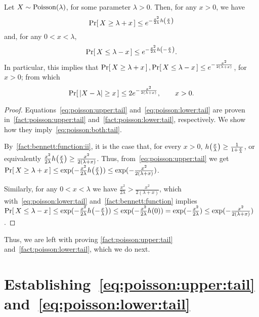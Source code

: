 \documentclass[10pt]{article}
\newcommand{\bennettfunc}{h}
\newcommand{\bennett}[1]{\bennettfunc\mleft(#1\mright)}
\begin{document}
\begin{theorem}\label{theo:main:poisson:bounds}
Let $X\sim\operatorname{Poisson}\!\left( \lambda \right) $, for some parameter $\lambda > 0$. Then, for any $x>0$, we have
\begin{equation}\label{eq:poisson:upper:tail}
    \probaOf{ X \geq \lambda + x} \leq e^{-\frac{x^2}{2\lambda}\bennett{\frac{x}{\lambda}}}
\end{equation}
and, for any $0<x< \lambda$,
\begin{equation}\label{eq:poisson:lower:tail}
  \probaOf{ X \leq \lambda - x} \leq e^{-\frac{x^2}{2\lambda}\bennett{-\frac{x}{\lambda}}}.
\end{equation}
In particular, this implies that $\Pr\!\left[\,  X \geq \lambda + x\, \right],\Pr\!\left[\,  X \leq \lambda - x\, \right] \leq e^{-\frac{x^2}{2(\lambda+x)}}$, for $x>0$; from which
\begin{equation}\label{eq:poisson:both:tail}
  \Pr\!\left[\,  \left\lvert X -\lambda \right\rvert \geq x\, \right] \leq 2e^{-\frac{x^2}{2(\lambda+x)}}, \qquad x>0.
\end{equation}
\end{theorem}
\begin{proof}
Equations~\eqref{eq:poisson:upper:tail} and~\eqref{eq:poisson:lower:tail} are proven in~\autoref{fact:poisson:upper:tail} and~\autoref{fact:poisson:lower:tail}, respectively. We show how they imply~\eqref{eq:poisson:both:tail}.

\noindent By~\autoref{fact:bennett:function:ii}, it is the case that,  for every $x>0$, $\bennett{\frac{x}{\lambda}} \geq \frac{1}{1+\frac{x}{\lambda}}$, or equivalently
$
\frac{x^2}{2\lambda} \bennett{\frac{x}{\lambda}} \geq \frac{x^2}{2(\lambda+x)}
$. Thus, from~\eqref{eq:poisson:upper:tail} we get $\probaOf{ X \geq \lambda + x} \leq \exp(-\frac{x^2}{2\lambda}\bennett{\frac{x}{\lambda}}) \leq \exp(-\frac{x^2}{2(\lambda+x)})$.

\noindent Similarly, for any $0<x<\lambda$ we have $\frac{x^2}{2\lambda} > \frac{x^2}{2(\lambda+x)}$, which with~\eqref{eq:poisson:lower:tail} and~\autoref{fact:bennett:function} implies
$
\probaOf{ X \leq \lambda - x} \leq \exp(-\frac{x^2}{2\lambda}\bennett{-\frac{x}{\lambda}}) \leq \exp(-\frac{x^2}{2\lambda}\bennett{0}) = \exp(-\frac{x^2}{2\lambda}) \leq \exp(-\frac{x^2}{2(\lambda+x)})
$.
\end{proof}

\noindent Thus, we are left with proving \autoref{fact:poisson:upper:tail} and~\autoref{fact:poisson:lower:tail}, which we do next.

\section{Establishing~\eqref{eq:poisson:upper:tail} and~\eqref{eq:poisson:lower:tail}}
\end{document}
